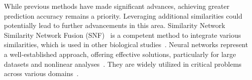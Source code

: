 \documentclass[unnumsec,webpdf,contemporary,large]{oup-authoring-template}%
\theoremstyle{thmstyleone}%
\theoremstyle{thmstyletwo}%
\theoremstyle{thmstylethree}%
\begin{document}
While previous methods have made significant advances, achieving greater prediction accuracy remains a priority. Leveraging additional similarities could potentially lead to further advancements in this area. Similarity Network Similarity Network Fusion (SNF)~\cite{Wang2014} is a competent method to integrate various similarities, which is used in other biological studies~\cite{Olayan2018, Tian2017, Kim2016}. Neural networks represent a well-established approach, offering effective solutions, particularly for large datasets and nonlinear analyses~\cite{Wang2016}. They are widely utilized in critical problems across various domains~\cite{HUANG2009, Fu2017, Pan2016}.
\end{document}
